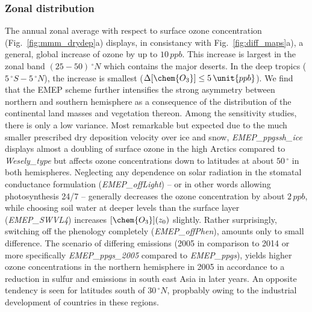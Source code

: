 \documentclass[gmd, manuscript]{copernicus}
\begin{document}
\subsubsection{Zonal distribution}
\label{subsubsec:zonal}
%
The annual zonal average with respect to surface ozone concentration (Fig.~\ref{fig:mmm_drydep}a) displays, in consistancy with Fig.~\ref{fig:diff_maps}a), a general, global increase of ozone by up to $10\,\unit{ppb}$. This increase is largest in the zonal band $(25-50)\,\unit{^\circ N}$ which contains the major deserts. In the deep tropics ($5\,\unit{^\circ S}-5\,\unit{^\circ N}$), the increase is smallest ($\Delta[\chem{O_3}]\leq 5\,\unit{ppb}$). We find that the EMEP scheme further intensifies the strong asymmetry between northern and southern hemisphere as a consequence of the distribution of the continental land masses and vegetation thereon. Among the sensitivity studies, there is only a low variance. Most remarkable but expected due to the much smaller prescribed dry deposition velocity over ice and snow, \emph{EMEP\_ppgssh\_ice} displays almost a doubling of surface ozone in the high Arctics compared to \emph{Wesely\_type} but affects ozone concentrations down to latitudes at about $50\,\unit{^\circ}$ in both hemispheres. Neglecting any dependence on solar radiation in the stomatal conductance formulation (\emph{EMEP\_offLight}) -- or in other words allowing photosynthesis 24/7 -- generally decreases the ozone concentration by about $2\,\unit{ppb}$, while choosing soil water at deeper levels than the surface layer (\emph{EMEP\_SWVL4}) increases $[\chem{O_3}](z_0)$ slightly. Rather surprisingly, switching off the phenology completely (\emph{EMEP\_offPhen}), amounts only to small difference. The scenario of differing emissions (2005 in comparison to 2014 or more specifically \emph{EMEP\_ppgs\_2005} compared to \emph{EMEP\_ppgs}), yields higher ozone concentrations in the northern hemisphere in 2005 in accordance to a reduction in sulfur and  emissions in south east Asia in later years. An opposite tendency is seen for latitudes south of $30\,\unit{^\circ N}$, propbably owing to the industrial development of countries in these regions. 
\end{document}
